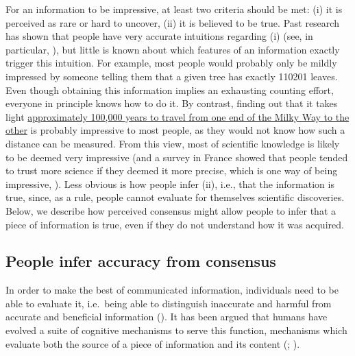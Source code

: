 \documentclass[
  jou,
  floatsintext,
  longtable,
  nolmodern,
  notxfonts,
  notimes,
  colorlinks=true,linkcolor=blue,citecolor=blue,urlcolor=blue]{apa7}
\begin{document}
For an information to be impressive, at least two criteria should be
met: (i) it is perceived as rare or hard to uncover, (ii) it is believed
to be true. Past research has shown that people have very accurate
intuitions regarding (i) (see, in particular,
),
but little is known about which features of an information exactly
trigger this intuition. For example, most people would probably only be
mildly impressed by someone telling them that a given tree has exactly
110201 leaves. Even though obtaining this information implies an
exhausting counting effort, everyone in principle knows how to do it. By
contrast, finding out that it takes light
\href{https://imagine.gsfc.nasa.gov/features/cosmic/milkyway_info.html}{approximately
100,000 years to travel from one end of the Milky Way to the other} is
probably impressive to most people, as they would not know how such a
distance can be measured. From this view, most of scientific knowledge
is likely to be deemed very impressive (and a survey in France showed
that people tended to trust more science if they deemed it more precise,
which is one way of being impressive,
).
Less obvious is how people infer (ii), i.e., that the information is
true, since, as a rule, people cannot evaluate for themselves scientific
discoveries. Below, we describe how perceived consensus might allow
people to infer that a piece of information is true, even if they do not
understand how it was acquired.

\subsection{People infer accuracy from
consensus}\label{people-infer-accuracy-from-consensus}

In order to make the best of communicated information, individuals need
to be able to evaluate it, i.e.~being able to distinguish inaccurate and
harmful from accurate and beneficial information
(). It has been argued that humans have evolved a suite of cognitive
mechanisms to serve this function, mechanisms which evaluate both the
source of a piece of information and its content
(;
).
\end{document}
